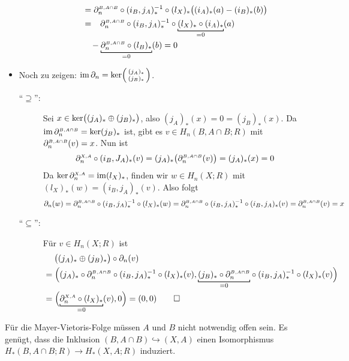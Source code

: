 \begin{beweis}
\begin{itemize}
\begin{description}
\begin{align*}
				&=  \rand{B, A\cap B}_n \circ  (i_B,j_A)_*^{-1} \circ (l_X)_* \enbrace[\big]{(i_A)_*(a)- (i_B)_*(b)}  \\
				&=\hphantom{-} \rand{B, A\cap B}_n \circ  (i_B,j_A)_*^{-1} \circ \underbracket[0.7pt][2pt]{(l_X)_* \circ (i_A)_*}_{=0} (a) \\
				&\,\hphantom{=} -\underbracket[0.7pt][2pt]{\rand{B, A\cap B}_n  \circ (l_B)_*}_{=0} (b) =0
			\end{align*}
		\end{description}
		\item Noch zu zeigen: $\im \partial_n = \ker \begin{psmallmatrix} (j_A)_* \\ (j_B)_* \end{psmallmatrix}$.
		\begin{description}
			\item[\enquote{$\supseteq$}:] Sei $x \in \ker \enbrace[\big]{(j_A)_* \oplus (j_B)_*}$, also $(j_A)_*(x) = 0 = (j_B)_*(x)$. Da $\im \rand{B,A \cap B}_n=\ker (j_B)_*$ ist, 
			gibt es $v \in H_n(B,A\cap B;R)$ mit $\rand{B,A\cap B}_n(v)=x$. Nun ist
			\[
				\rand{X,A}_n \circ (i_B,J_A)_*(v) = (j_A)_* \enbrace[\big]{\rand{B,A\cap B}_n(v)} = (j_A)_*(x) = 0
			\]
			Da $\ker \rand{X,A}_n = \im (l_X)_*$, finden wir $w \in H_n(X;R)$ mit $(l_X)_*(w) = (i_B,j_A)_* (v)$. Also folgt
			\[
				\partial_n(w) = \rand{B,A\cap B}_n \circ (i_B,j_A)_*^{-1} \circ (l_X)_* (w) = \rand{B,A\cap B}_n \circ (i_B,j_A)_*^{-1}\circ (i_B,j_A)_* (v) 
				= \rand{B,A\cap B}_n(v) = x
			\]
			\item[\enquote{$\subseteq$}:] Für $v \in H_n(X;R)$ ist
			\begin{align*}
				& \hphantom{=} \enspace \enbrace[\big]{(j_A)_* \oplus (j_B)_*} \circ \partial_n(v) \\
				&= \enbrace[\Big]{(j_A)_* \circ \rand{B,A \cap B}_n \circ (i_B,j_A)_* ^{-1} \circ (l_X)_*(v) ,
				{\underbracket[0.7pt][2pt]{(j_B)_* \circ \rand{B,A\cap B}_n}_{=0}} \circ (i_B,j_A)_* ^{-1} \circ (l_X)_* (v) } \\
				&= \enbrace[\Big]{{\underbracket[0.7pt][2pt]{\rand{X,A}_n \circ (l_X)_*}_{=0}}(v), 0  } = (0,0)\qedhere
			\end{align*}
		\end{description}
	\end{itemize}
\end{beweis}

\begin{bemerkung}[{name=[Anwendbarkeit der Mayer-Vietoris-Folge]}]
	Für die Mayer-Vietoris-Folge müssen $A$ und $B$ nicht notwendig offen sein. 
	Es genügt, dass die Inklusion $(B,A \cap B) \hookrightarrow (X,A)$ einen Isomorphismus $H_*(B,A \cap B;R) \to H_*(X,A;R)$ induziert.
\end{bemerkung}

